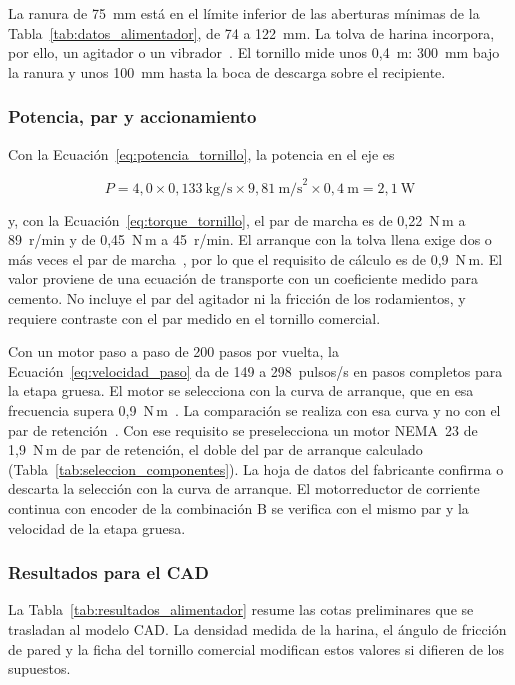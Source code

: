 La ranura de 75~mm está en el límite inferior de las aberturas mínimas
de la Tabla~\ref{tab:datos_alimentador}, de 74 a 122~mm. La tolva de harina
incorpora, por ello, un agitador o un vibrador~\parencite{bates2000screw}.
El tornillo mide unos 0,4~m: 300~mm bajo la ranura y unos 100~mm hasta la
boca de descarga sobre el recipiente.

\subsubsection{Potencia, par y accionamiento}

Con la Ecuación~\eqref{eq:potencia_tornillo}, la potencia en el eje es

\begin{equation*}
    P = 4{,}0 \times 0{,}133~\text{kg/s} \times 9{,}81~\text{m/s}^{2}
    \times 0{,}4~\text{m} = 2{,}1~\text{W}
\end{equation*}

\noindent y, con la Ecuación~\eqref{eq:torque_tornillo}, el par de marcha
es de 0,22~N\,m a 89~r/min y de 0,45~N\,m a 45~r/min. El arranque con la
tolva llena exige dos o más veces el par de marcha~\parencite{bates2000screw},
por lo que el requisito de cálculo es de 0,9~N\,m. El valor proviene de
una ecuación de transporte con un coeficiente medido para cemento. No
incluye el par del agitador ni la fricción de los rodamientos, y requiere
contraste con el par medido en el tornillo comercial.

Con un motor paso a paso de 200 pasos por vuelta, la
Ecuación~\eqref{eq:velocidad_paso} da de 149 a 298~pulsos/s en pasos
completos para la etapa gruesa. El motor se selecciona con la curva de
arranque, que en esa frecuencia supera 0,9~N\,m~\parencite{nidec2026stepping}.
La comparación se realiza con esa curva y no con el par de retención~\parencite{orientalStepperSpec}.
Con ese requisito se preselecciona un motor NEMA~23 de 1,9~N\,m de par de
retención, el doble del par de arranque calculado
(Tabla~\ref{tab:seleccion_componentes}). La hoja de datos del fabricante
confirma o descarta la selección con la curva de arranque. El motorreductor
de corriente continua con encoder de la combinación B se verifica con el
mismo par y la velocidad de la etapa gruesa.

\subsubsection{Resultados para el CAD}

La Tabla~\ref{tab:resultados_alimentador} resume las cotas preliminares
que se trasladan al modelo CAD. La densidad medida de la harina, el
ángulo de fricción de pared y la ficha del tornillo comercial modifican
estos valores si difieren de los supuestos.

